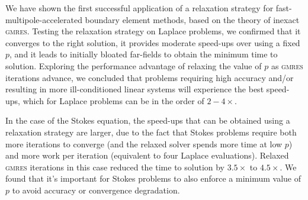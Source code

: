 \documentclass[final,leqno,]{siamltex1213}
\newcommand{\gmres}{\textsc{gmres}\xspace}
\begin{document}
We have shown the first successful application of a relaxation strategy for fast-multipole-accelerated boundary element methods, based on the theory of inexact \gmres. Testing the relaxation strategy on Laplace problems, we confirmed that it converges to the right solution, it provides moderate speed-ups over using a fixed $p$, and it leads to initially bloated far-fields to obtain the minimum time to solution.
Exploring the performance advantage of relaxing the value of $p$ as \gmres iterations advance, we concluded that problems requiring high accuracy and/or resulting in more ill-conditioned linear systems will experience the best speed-ups, which for Laplace problems can be in the order of $2-4\times$.

In the case of the Stokes equation, the speed-ups that can be obtained using a relaxation strategy are larger, due to the fact that Stokes problems require both more iterations to converge (and the relaxed solver spends more time at low $p$) and more work per iteration (equivalent to four Laplace evaluations). Relaxed \gmres iterations in this case reduced the time to solution by $3.5\times$ to $4.5\times$. We found that it's important for Stokes problems to also enforce a minimum value of $p$ to avoid accuracy or convergence degradation.


 



\end{document}

